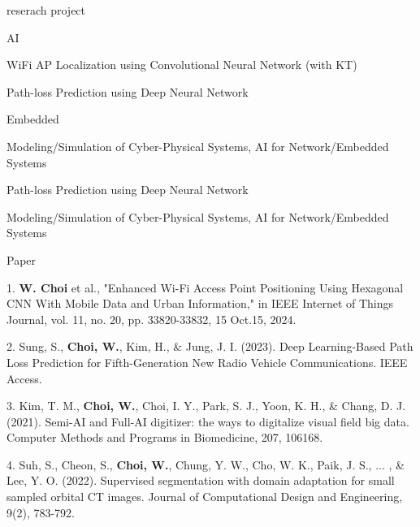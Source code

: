 \documentclass[
	11pt, %
]{resume} %
\begin{document}
\begin{rSection}{reserach project}
	\begin{rSubsection}{AI}{}{}{}
		\item WiFi AP Localization using Convolutional Neural Network (with KT)
		\item Path-loss Prediction using Deep Neural Network
		\item 

	\begin{rSubsection}{Embedded}{}{}{}
		\item Modeling/Simulation of Cyber-Physical Systems, AI for Network/Embedded Systems
	\end{rSubsection}
		\item Path-loss Prediction using Deep Neural Network
		\item Modeling/Simulation of Cyber-Physical Systems, AI for Network/Embedded Systems
	\end{rSubsection}

\end{rSection}



\begin{rSection}{Paper}

	1. \textbf{W. Choi} et al., "Enhanced Wi-Fi Access Point Positioning Using Hexagonal CNN With Mobile Data and Urban Information," in IEEE Internet of Things Journal, vol. 11, no. 20, pp. 33820-33832, 15 Oct.15, 2024.

	2. Sung, S., \textbf{Choi, W.}, Kim, H., \& Jung, J. I. (2023). Deep Learning-Based Path Loss Prediction for Fifth-Generation New Radio Vehicle Communications. IEEE Access.
	
	3. Kim, T. M., \textbf{Choi, W.}, Choi, I. Y., Park, S. J., Yoon, K. H., \& Chang, D. J. (2021). Semi-AI and Full-AI digitizer: the ways to digitalize visual field big data. Computer Methods and Programs in Biomedicine, 207, 106168.

	4. Suh, S., Cheon, S., \textbf{Choi, W.}, Chung, Y. W., Cho, W. K., Paik, J. S., ... , \& Lee, Y. O. (2022). Supervised segmentation with domain adaptation for small sampled orbital CT images. Journal of Computational Design and Engineering, 9(2), 783-792.


\end{rSection}
\end{document}
